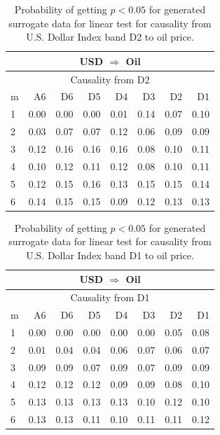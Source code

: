 %
%
\begin{table}[H]
\begin{center}
\begin{tabular}{l|r r r r r r r}
\hline\hline
\multicolumn{8}{c}{USD $\Rightarrow$ Oil}\\
\hline
\multicolumn{8}{c}{Causality from D2}\\
\hline\hline
m & A6 & D6 & D5 & D4 & D3 & D2 & D1 \\
\hline
1 & 0.00 & 0.00 & 0.00 & 0.01 & 0.14 & 0.07 & 0.10 \\
2 & 0.03 & 0.07 & 0.07 & 0.12 & 0.06 & 0.09 & 0.09 \\
3 & 0.12 & 0.16 & 0.16 & 0.16 & 0.08 & 0.10 & 0.11 \\
4 & 0.10 & 0.12 & 0.11 & 0.12 & 0.08 & 0.10 & 0.11 \\
5 & 0.12 & 0.15 & 0.16 & 0.13 & 0.15 & 0.15 & 0.14 \\
6 & 0.14 & 0.15 & 0.15 & 0.09 & 0.12 & 0.13 & 0.13 \\
\hline\hline
\end{tabular}
\caption{Probability of getting $p < 0.05$ for generated surrogate data for linear test for causality from U.S. Dollar Index band D2 to oil price.}
\end{center}
\end{table}

%
%
\begin{table}[H]
\begin{center}
\begin{tabular}{l|r r r r r r r}
\hline\hline
\multicolumn{8}{c}{USD $\Rightarrow$ Oil}\\
\hline
\multicolumn{8}{c}{Causality from D1}\\
\hline\hline
m & A6 & D6 & D5 & D4 & D3 & D2 & D1 \\
\hline
1 & 0.00 & 0.00 & 0.00 & 0.00 & 0.00 & 0.05 & 0.08 \\
2 & 0.01 & 0.04 & 0.04 & 0.06 & 0.07 & 0.06 & 0.07 \\
3 & 0.09 & 0.09 & 0.07 & 0.09 & 0.07 & 0.09 & 0.09 \\
4 & 0.12 & 0.12 & 0.12 & 0.09 & 0.09 & 0.08 & 0.10 \\
5 & 0.13 & 0.13 & 0.13 & 0.13 & 0.10 & 0.12 & 0.10 \\
6 & 0.13 & 0.13 & 0.11 & 0.10 & 0.11 & 0.11 & 0.12 \\
\hline\hline
\end{tabular}
\caption{Probability of getting $p < 0.05$ for generated surrogate data for linear test for causality from U.S. Dollar Index band D1 to oil price.}
\end{center}
\end{table}

